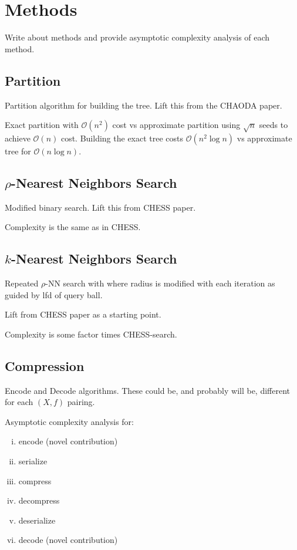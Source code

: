 \section{Methods}
\label{sec:methods}

Write about methods and provide asymptotic complexity analysis of each method.

\subsection{Partition}
\label{subsec:methods:partition}

Partition algorithm for building the tree.
Lift this from the CHAODA paper.

Exact partition with $\mathcal{O}(n^2)$ cost vs approximate partition using $\sqrt{n}$ seeds to achieve $\mathcal{O}(n)$ cost.
Building the exact tree costs $\mathcal{O}(n^2 \log n)$ vs approximate tree for $\mathcal{O}(n \log n)$.

\subsection{\texorpdfstring{$\rho$}{p}-Nearest Neighbors Search}
\label{subsec:methods:rnn-search}

Modified binary search.
Lift this from CHESS paper.

Complexity is the same as in CHESS.

\subsection{\texorpdfstring{$k$}{k}-Nearest Neighbors Search}
\label{subsec:methods:knn-search}

Repeated $\rho$-NN search with where radius is modified with each iteration as guided by lfd of query ball.

Lift from CHESS paper as a starting point.

Complexity is some factor times CHESS-search.

\subsection{Compression}
\label{subsec:methods:compression}

Encode and Decode algorithms.
These could be, and probably will be, different for each $(X, f)$ pairing.

Asymptotic complexity analysis for:
\begin{enumerate}[i.]
    \item encode (novel contribution)
    \item serialize
    \item compress
    \item decompress
    \item deserialize
    \item decode (novel contribution)
\end{enumerate}

